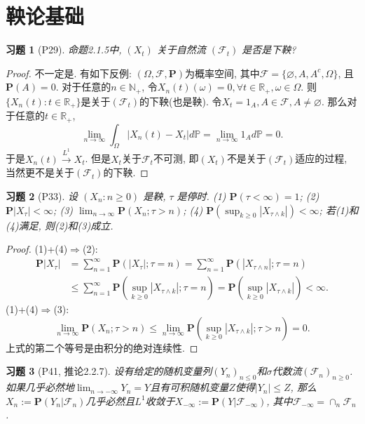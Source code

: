 \documentclass[UTF8,ondside]{ctexart}
\newtheorem{exercise}{习题}[section]
\newcommand{\h}{\mathscr}
\newcommand{\kx}{\mathbb}
\newcommand{\mbf}{\mathbf}
\numberwithin{equation}{section}
\begin{document}
	\section{鞅论基础}
	\begin{exercise}[P29]
		命题2.1.5中, $(X_t)$ 关于自然流 $(\h F_t)$ 是否是下鞅? 
	\end{exercise}
	\begin{proof}
		不一定是. 有如下反例: $(\Omega,\h F,\mbf P)$为概率空间, 其中$\h F=\{\varnothing,A,A^c,\Omega\}$, 且$\mbf P(A)=0$. 对于任意的$n\in \kx N_+$, 令$X_n(t)(\omega) = 0,\forall t\in\kx R_+,\omega\in\Omega$. 则$\{X_n(t):t\in\kx R_+\}$是关于$(\h F_t)$的下鞅(也是鞅). 令$X_t=1_A,A\in\h F,A\neq\varnothing$. 那么对于任意的$t\in\kx R_+$,
		\[
			\lim_{n\rightarrow\infty}\int_\Omega |X_n(t)-X_t|d\kx P=\lim_{n\rightarrow\infty} 1_A d\kx P = 0.
		\]
		于是$X_n(t)\xrightarrow{L^1}X_t$. 但是$X_t$关于$\h F_t$不可测, 即$(X_t)$不是关于$(\h F_t)$适应的过程, 当然更不是关于$(\h F_t)$的下鞅. 
	\end{proof}
	\begin{exercise}[P33]
		设 $(X_n:n\geq 0)$ 是鞅, $\tau$ 是停时. (1) $\mbf P(\tau<\infty)=1$;   (2) $\mbf P|X_\tau|<\infty$; (3) $\lim_{n\rightarrow\infty}\mbf P(X_n;\tau > n)$; (4) $\mbf P(\sup_{k\geq 0}|X_{\tau\land k}|)<\infty$; 若(1)和(4)满足, 则(2)和(3)成立. 
	\end{exercise}
	\begin{proof}
		(1)+(4)$\Rightarrow$(2): 
		\[\begin{aligned}
			\mbf P|X_\tau|&=\sum_{n=1}^\infty\mbf P(|X_\tau|; {\tau=n})=\sum_{n=1}^\infty\mbf P(|X_{\tau\land n}|; {\tau=n})\\
			&\leq \sum_{n=1}^\infty\mbf P(\sup_{k\geq 0}|X_{\tau\land k}|; {\tau=n})=\mbf P(\sup_{k\geq 0}|X_{\tau\land k}|)<\infty.
		\end{aligned}\]
		(1)+(4)$\Rightarrow$(3): 
		\[
			\lim_{n\rightarrow\infty}\mbf P(X_n;\tau>n)\leq\lim_{n\rightarrow\infty}\mbf P(\sup_{k\geq 0}|X_{\tau\land k}|;\tau>n)=0.
		\]
		上式的第二个等号是由积分的绝对连续性.
	\end{proof}
	\begin{exercise}[P41, 推论2.2.7]
		设有给定的随机变量列$(Y_n)_{n\leq 0}$和$\sigma$代数流$(\h F_n)_{n\geq 0}$. 如果几乎必然地$\lim_{n\rightarrow -\infty}Y_n=Y$且有可积随机变量$Z$使得$|Y_n|\leq Z$, 那么$X_n:=\mbf P(Y_n|\h F_n)$几乎必然且$L^1$收敛于$X_{-\infty}:=\mbf P(Y|\h F_{-\infty})$, 其中$\h F_{-\infty}=\cap_{n}\h F_n$.
	\end{exercise}
\end{document}
